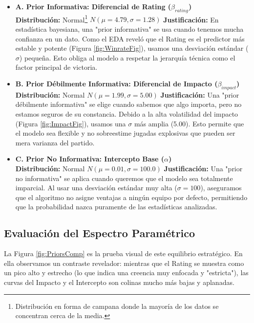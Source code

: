 \documentclass[twocolumn,10pt]{article}
\begin{document}
\begin{itemize}
    \item \textbf{A. Prior Informativa: Diferencial de Rating ($\beta_{rating}$)}\\
    \textbf{Distribución:} Normal\footnote{Distribución en forma de campana donde la mayoría de los datos se concentran cerca de la media.} $N(\mu = 4.79, \sigma = 1.28)$\newline
    \textbf{Justificación:} En estadística bayesiana, una "prior informativa" se usa cuando tenemos mucha confianza en un dato. Como el EDA reveló que el Rating es el predictor más estable y potente (Figura \ref{fig:WinrateFig}), usamos una desviación estándar ($\sigma$) pequeña. Esto obliga al modelo a respetar la jerarquía técnica como el factor principal de victoria.
    
    \item \textbf{B. Prior Débilmente Informativa: Diferencial de Impacto ($\beta_{impact}$)}\\
    \textbf{Distribución:} Normal $N(\mu = 1.99, \sigma = 5.00)$\newline
    \textbf{Justificación:} Una "prior débilmente informativa" se elige cuando sabemos que algo importa, pero no estamos seguros de su constancia. Debido a la alta volatilidad del impacto (Figura \ref{fig:ImpactFig}), usamos una $\sigma$ más amplia (5.00). Esto permite que el modelo sea flexible y no sobreestime jugadas explosivas que pueden ser mera varianza del partido.
    
    \item \textbf{C. Prior No Informativa: Intercepto Base ($\alpha$)}\\
    \textbf{Distribución:} Normal $N(\mu = 0.01, \sigma = 100.0)$\newline
    \textbf{Justificación:} Una "prior no informativa" se aplica cuando queremos que el modelo sea totalmente imparcial. Al usar una desviación estándar muy alta ($\sigma = 100$), aseguramos que el algoritmo no asigne ventajas a ningún equipo por defecto, permitiendo que la probabilidad nazca puramente de las estadísticas analizadas.
\end{itemize}

\subsection{Evaluación del Espectro Paramétrico}

La Figura \ref{fig:PriorsComp} es la prueba visual de este equilibrio estratégico. En ella observamos un contraste revelador: mientras que el Rating se muestra como un pico alto y estrecho (lo que indica una creencia muy enfocada y "estricta"), las curvas del Impacto y el Intercepto son colinas mucho más bajas y aplanadas. 
\end{document}
